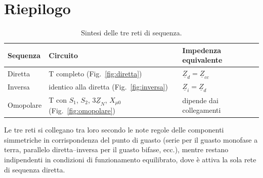 \documentclass[11pt,a4paper]{article}
\newcommand{\ph}[1]{\underline{#1}}
\begin{document}
\section{Riepilogo}

\begin{table}[htbp]
\centering
\caption{Sintesi delle tre reti di sequenza.}
\label{tab:riepilogo}
\begin{tabular}{lll}
\toprule
Sequenza & Circuito & Impedenza equivalente \\
\midrule
Diretta  & T completo (Fig.~\ref{fig:diretta})  & $\ph{Z}_d = \ph{Z}_{cc}$ \\
Inversa  & identico alla diretta (Fig.~\ref{fig:inversa}) & $\ph{Z}_i = \ph{Z}_d$ \\
Omopolare& T con $S_1$, $S_2$, $3\ph{Z}_N$, $X_{\mu 0}$
           (Fig.~\ref{fig:omopolare}) & dipende dai collegamenti \\
\bottomrule
\end{tabular}
\end{table}

Le tre reti si collegano tra loro secondo le note regole delle componenti
simmetriche in corrispondenza del punto di guasto (serie per il guasto
monofase a terra, parallelo diretta--inversa per il guasto bifase, ecc.),
mentre restano indipendenti in condizioni di funzionamento equilibrato, dove
è attiva la sola rete di sequenza diretta.
\end{document}
